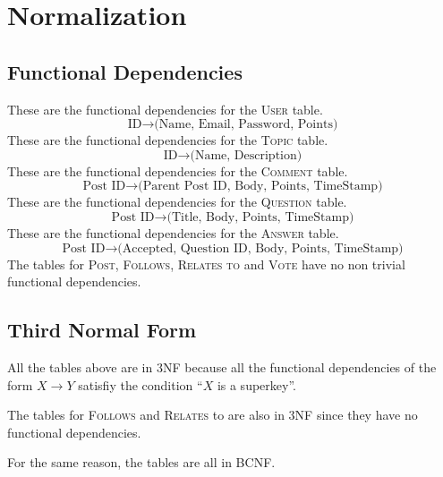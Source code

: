 \section{Normalization}
\subsection{Functional Dependencies}
These are the functional dependencies for the \textsc{User} table.
\[\text{ID} \to \text{(Name, Email, Password, Points)}\]
These are the functional dependencies for the \textsc{Topic} table.
\[\text{ID} \to \text{(Name, Description)}\]
These are the functional dependencies for the \textsc{Comment} table.
\[\text{Post ID} \to \text{(Parent Post ID, Body, Points, TimeStamp)}\]
These are the functional dependencies for the \textsc{Question} table.
\[\text{Post ID} \to \text{(Title, Body, Points, TimeStamp)}\]
These are the functional dependencies for the \textsc{Answer} table.
\[\text{Post ID} \to \text{(Accepted, Question ID, Body, Points, TimeStamp)}\]
The tables for \textsc{Post}, \textsc{Follows}, \textsc{Relates to} and \textsc{Vote} have no non trivial functional dependencies.


\subsection{Third Normal Form}
All the tables above are in 3NF because all the functional dependencies of the form \(X \to Y\) satisfiy the condition ``\(X\) is a superkey''.

The tables for \textsc{Follows} and \textsc{Relates} to are also in 3NF since they have no functional dependencies.

For the same reason, the tables are all in BCNF.